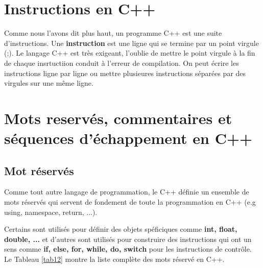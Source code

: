 \documentclass[a4paper, oneside,11pt]{book}
\begin{document}
\section{Instructions en C++}

Comme nous l'avons dit plus haut, un programme C++ est une suite d'instructions. Une \textbf{instruction} est une ligne qui se termine par un point virgule (;). 
Le langage C++ est tr\`es exigeant, l'oublie de mettre le point virgule \`a la fin de chaque insrtuctiion conduit \`a l'erreur de compilation. On peut \'ecrire 
les instructions ligne par ligne ou mettre plusieures instructions s\'epar\'ees par des virgules sur une m\^eme ligne.


\section{Mots reserv\'es, commentaires et s\'equences d'\'echappement en C++}

 \subsection{Mot r\'eserv\'es}
 
Comme tout autre langage de programmation, le C++ d\'efinie un ensemble de mots r\'eserv\'es qui servent de fondement de toute la programmation en 
C++ (e.g using, namespace, return, ...).

Certains sont utilis\'es pour d\'efinir des objets sp\'eficiques comme \textbf{int, float, double, ...} et d'autres sont utilis\'es pour construire des instructions qui ont 
 un sens comme \textbf{if, else, for, while, do, switch} pour les instructions de contr\^ole. Le Tableau \ref{tab12} montre la liste compl\`ete des mots r\'eserv\'e 
 en C++. 
 
\end{document}
